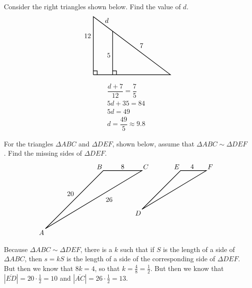 \documentclass[11pt,letterpaper]{article}
\begin{document}

 Consider the right triangles shown below. Find the value of $d$.
	\[
	\begin{tikzpicture}
	\draw[line width=0.03cm] (0,0) -- (0,3) -- (4,0) -- (0,0);
	\draw[line width=0.03cm] (1,0) -- (1,2.25);
	\draw[line width=0.03cm] (0,0.2) -- (0.2,0.2) -- (0.2,0);
	\draw[line width=0.03cm] (1,0.2) -- (1.2,0.2) -- (1.2,0);
	\node at (-0.3,2) {$12$};
	\node at (0.8,1) {$5$};
	\node at (0.7,2.8) {$d$};
	\node at (2.5,1.5) {$7$};
	\end{tikzpicture}
	\] \pspace

\sol 
	\[
	\begin{gathered}
	\dfrac{d + 7}{12}= \dfrac{7}{5} \\[0.3cm]
	5d + 35= 84 \\[0.3cm]
	5d= 49 \\[0.3cm]
	d= \dfrac{49}{5} \approx 9.8
	\end{gathered}
	\]



\newpage



 For the triangles $\Delta ABC$ and $\Delta DEF$, shown below, assume that $\Delta ABC \sim \Delta DEF$. Find the missing sides of $\Delta DEF$. 
	\[
	\begin{tikzpicture}
	\node at (-3.2,-3.2) {$A$};
	\node at (-0.2,0.2) {$B$};
	\node at (2.2,0.2) {$C$};
	\node at (-1.7,-1.2) {$20$};
	\node at (1,0.2) {$8$};
	\node at (0.3,-1.5) {$26$};
	\draw[line width=0.03cm] (-3,-3) -- (0,0) -- (2,0) -- (-3,-3);
	
	\tikzset{shift={(4,0)}}
	
	\node at (-2.2,-2.2) {$D$};
	\node at (-0.2,0.2) {$E$};
	\node at (4/3+0.2,0.2) {$F$};
	\node at (0.6,0.2) {$4$};
	\draw[line width=0.03cm] (-2,-2) -- (0,0) -- (4/3,0) -- (-2,-2);
	\end{tikzpicture}
	\] \pspace

\sol Because $\Delta ABC \sim \Delta DEF$, there is a $k$ such that if $S$ is the length of a side of $\Delta ABC$, then $s= kS$ is the length of a side of the corresponding side of $\Delta DEF$. But then we know that $8k= 4$, so that $k= \frac{4}{8}= \frac{1}{2}$. But then we know that $|\overline{ED}|= 20 \cdot \frac{1}{2}= 10$ and $|\overline{AC}|= 26 \cdot \frac{1}{2}= 13$. 
\end{document}
